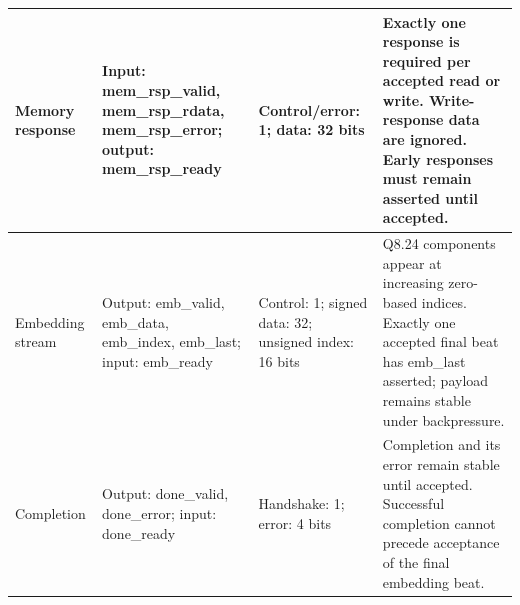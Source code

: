 \documentclass[11pt,a4paper]{article}
\begin{document}
{\begin{longtable}{@{}L{0.21\textwidth}|L{0.12\textwidth}|L{0.12\textwidth}|L{0.45\textwidth}@{}}
Memory response & Input: mem\_\allowbreak{}rsp\_\allowbreak{}valid,\allowbreak{} mem\_\allowbreak{}rsp\_\allowbreak{}rdata,\allowbreak{} mem\_\allowbreak{}rsp\_\allowbreak{}error; output: mem\_\allowbreak{}rsp\_\allowbreak{}ready & Control/\allowbreak{}error: 1; data: 32 bits & Exactly one response is required per accepted read or write. Write-response data are ignored. Early responses must remain asserted until accepted.\\[2pt]\hline

Embedding stream & Output: emb\_\allowbreak{}valid,\allowbreak{} emb\_\allowbreak{}data,\allowbreak{} emb\_\allowbreak{}index,\allowbreak{} emb\_\allowbreak{}last; input: emb\_\allowbreak{}ready & Control: 1; signed data: 32; unsigned index: 16 bits & Q8.24 components appear at increasing zero-based indices. Exactly one accepted final beat has emb\_\allowbreak{}last asserted; payload remains stable under backpressure.\\[2pt]\hline

Completion & Output: done\_\allowbreak{}valid,\allowbreak{} done\_\allowbreak{}error; input: done\_\allowbreak{}ready & Handshake: 1; error: 4 bits & Completion and its error remain stable until accepted. Successful completion cannot precede acceptance of the final embedding beat.\\[2pt]\hline

\bottomrule\end{longtable}}
\end{document}
